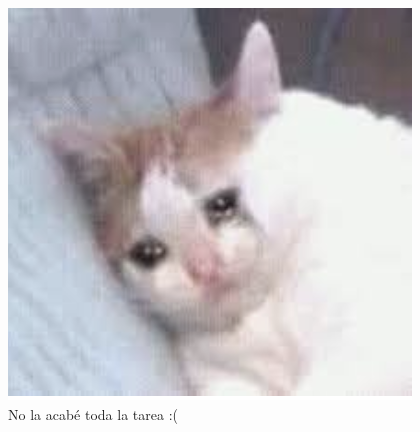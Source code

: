 \documentclass[11pt,letterpaper]{report}
\begin{document}
\begin{enumerate}
\begin{figure}[H]
    \centering
    \includegraphics[scale=0.9]{gato.png}
    \caption{No la acabé toda la tarea :(}
\end{figure}
\end{enumerate}




\end{document}
